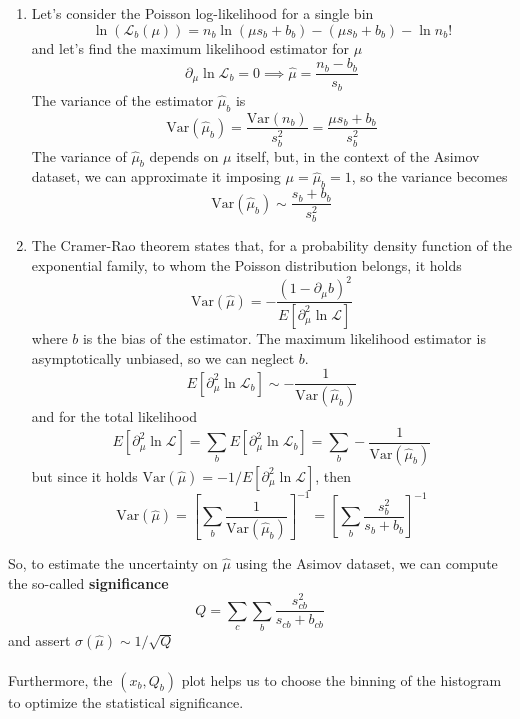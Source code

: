 \begin{enumerate}
    \item Let's consider the Poisson log-likelihood for a single bin
\begin{equation}
    \ln\left(\mathcal{L}_b(\mu)\right)=n_b \ln(\mu s_b + b_b) - (\mu s_b + b_b)-\ln n_b! 
\end{equation}
and let's find the maximum likelihood estimator for $\mu$
\begin{equation}
    \partial_\mu \ln{\mathcal{L}_b}=0 \implies \hat{\mu}=\frac{n_b-b_b}{s_b}
\end{equation}
The variance of the estimator $\hat{\mu}_b$ is
\begin{equation}
    {\mathrm{Var}}(\hat{\mu}_b)=\frac{{\mathrm{Var}}(n_b)}{s_b^2}=\frac{\mu s_b + b_b }{s_b^2}
\end{equation}
The variance of $\hat{\mu}_b$ depends on $\mu$ itself, but, in the context of the Asimov dataset, we can approximate it imposing $\mu=\hat{\mu}_b=1$, so the variance becomes
\begin{equation}
    {\mathrm{Var}}(\hat{\mu}_b)\sim \frac{s_b+b_b}{s_b^2}
\end{equation}
\newpage
 \item The Cramer-Rao theorem \cite{James2006StatisticalEdition} states that, for a probability density function of the exponential family, to whom the Poisson distribution belongs, it holds
\begin{equation}
    \mathrm{Var}(\hat{\mu})=-\frac{(1-\partial_\mu b)^2}{E[\partial_\mu^2 \ln \mathcal{L}]}
\end{equation}
where $b$ is the bias of the estimator.
The maximum likelihood estimator is asymptotically unbiased, so we can neglect $b$.
\begin{equation}
    E[\partial_\mu^2 \ln \mathcal{L}_b]\sim-\frac{1}{\mathrm{Var}(\hat{\mu}_b)}
\end{equation}
and for the total likelihood
\begin{equation}
    E[\partial_\mu^2 \ln \mathcal{L}]=
    \sum_b E[\partial_\mu^2 \ln \mathcal{L}_b]=\sum_b
    -\frac{1}{\mathrm{Var}(\hat{\mu}_b)}
\end{equation}
but since it holds $\mathrm{Var}(\hat{\mu}) =-1/E[\partial_\mu^2 \ln \mathcal{L}]$, then
\begin{equation}
    \mathrm{Var}(\hat{\mu})=\left[\sum_b \frac{1}{\mathrm{Var}(\hat{\mu}_b)}\right]^{-1}= \left[\sum_b \frac{s_b^2}{s_b+b_b} \right]^{-1}
\end{equation}
\end{enumerate}
So, to estimate the uncertainty on $\hat{\mu}$ using the Asimov dataset, we can compute the so-called \textbf{significance}
\begin{equation}
    Q=\sum_c \sum_b \frac{s_{cb}^2}{s_{cb}+b_{cb}}
\end{equation}
and assert $\sigma(\hat{\mu}) \sim 1/\sqrt{Q}$\\
\\
Furthermore, the $(x_b,Q_b)$ plot helps us to choose the binning of the histogram to optimize the statistical significance.
